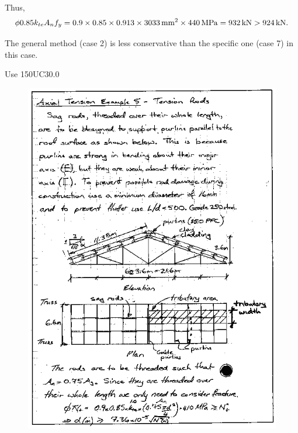 \begin{solution}
Thus,
\begin{gather*}
\phi0.85k_{te}A_nf_y=0.9\times0.85\times0.913\times\SI{3033}{\milli\meter^2}\times\SI{440}{\mega\pascal}=\SI{932}{\kilo\newton}>\SI{924}{\kilo\newton}.
\end{gather*}

The general method (case 2) is less conservative than the specific one (case 7) in this case.
\begin{flushright}
Use 150UC30.0
\end{flushright}
\begin{figure}[H]
\centering

\end{figure}
\end{solution}

\begin{figure}[p]
\centering\includegraphics[width=.99\textwidth]{PIC/CH03/TR1}
\end{figure}
